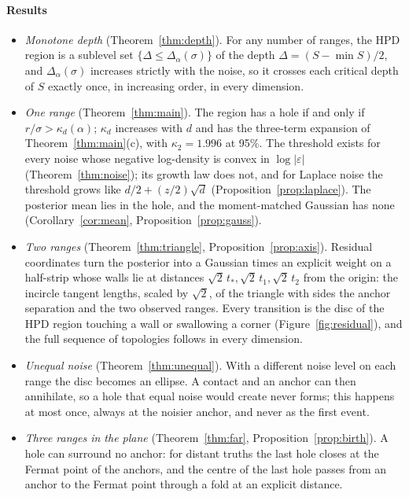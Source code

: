\paragraph{Results}
\begin{itemize}[leftmargin=1.2em]
\item \emph{Monotone depth} (Theorem~\ref{thm:depth}). For any number of ranges, the HPD region is a sublevel set
$\{\Delta \le \Delta_\alpha(\sigma)\}$ of the depth $\Delta = (S - \min S)/2$, and $\Delta_\alpha(\sigma)$ increases
strictly with the noise, so it crosses each critical depth of $S$ exactly once, in increasing order, in every
dimension.
\item \emph{One range} (Theorem~\ref{thm:main}). The region has a hole if and only if $r/\sigma > \kappa_d(\alpha)$;
$\kappa_d$ increases with $d$ and has the three-term expansion of Theorem~\ref{thm:main}(c), with $\kappa_2 = 1.996$ at 95\%. The threshold exists for every
noise whose negative log-density is convex in $\log|\varepsilon|$ (Theorem~\ref{thm:noise}); its growth law does not, and for
Laplace noise the threshold grows like $d/2 + (z/2)\sqrt d$ (Proposition~\ref{prop:laplace}). The posterior mean lies in the
hole, and the moment-matched Gaussian has none (Corollary~\ref{cor:mean}, Proposition~\ref{prop:gauss}).
\item \emph{Two ranges} (Theorem~\ref{thm:triangle}, Proposition~\ref{prop:axis}). Residual coordinates turn the
posterior into a Gaussian times an explicit weight on a half-strip whose walls lie at distances
$\sqrt2\,t_*, \sqrt2\,t_1, \sqrt2\,t_2$ from the origin: the incircle tangent lengths, scaled by $\sqrt 2$, of the
triangle with sides the anchor separation and the two observed ranges. Every transition
is the disc of the HPD region touching a wall or swallowing a corner (Figure~\ref{fig:residual}), and the full sequence
of topologies follows in every dimension.
\item \emph{Unequal noise} (Theorem~\ref{thm:unequal}). With a different noise level on each range the disc becomes an
ellipse. A contact and an anchor can then annihilate, so a hole that equal noise would create never forms; this happens at
most once, always at the noisier anchor, and never as the first event.
\item \emph{Three ranges in the plane} (Theorem~\ref{thm:far}, Proposition~\ref{prop:birth}). A hole can surround no
anchor: for distant truths the last hole closes at the Fermat point of the anchors, and the centre of the last hole
passes from an anchor to the Fermat point through a fold at an explicit distance.

\end{itemize}
